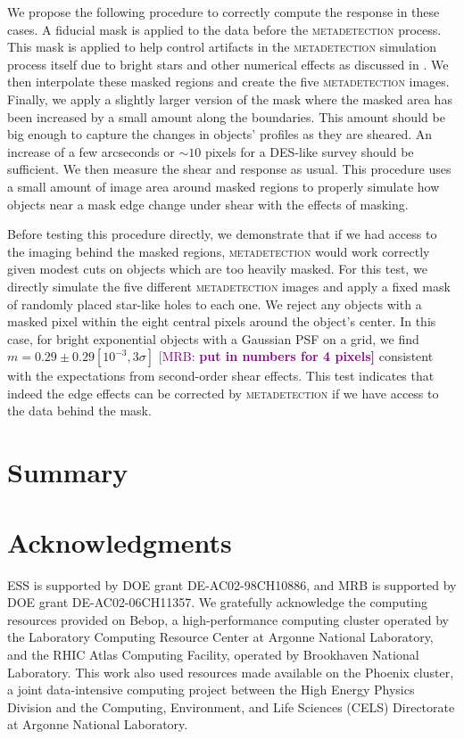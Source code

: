 \documentclass[twocolappendix, appendixfloats, numberedappendix, twocolumn, apj]{openjournal}
\newcommand{\mrb}[1]{\textcolor{purple}{[MRB: \bf #1]}\xspace}
\newcommand{\mdet}{\textsc{metadetection}\xspace}
\begin{document}
We propose the following procedure to correctly compute the response in these cases. A fiducial mask is applied to the data before 
the \mdet process. This mask is applied to help control artifacts in the \mdet simulation process itself due to bright stars 
and other numerical effects as discussed in \citep{sheldoninprep}. We then interpolate these masked regions and create the five 
\mdet images. Finally, we apply a slightly larger version of the mask where the masked area has been increased by a small amount 
along the boundaries. This amount should be big enough to capture the changes in objects' profiles as they are sheared. An 
increase of a few arcseconds or $\sim10$ pixels for a DES-like survey should be sufficient. We then measure the shear and 
response as usual. This procedure uses a small amount of image area around masked regions to properly simulate how objects near a 
mask edge change under shear with the effects of masking.

Before testing this procedure directly, we demonstrate that if we had access to the imaging behind the masked regions, \mdet would work 
correctly given modest cuts on objects which are too heavily masked. For this test, we directly simulate the five different \mdet images 
and apply a fixed mask of randomly placed star-like holes to each one. We reject any objects with a masked pixel within the eight central pixels around the object's center. In this case, for bright exponential objects with a Gaussian PSF on a grid, we find $m=0.29 \pm 0.29 [10^{-3}, 3\sigma]$ \mrb{put in numbers for 4 pixels} consistent with the expectations from second-order shear effects. This test indicates that indeed the edge effects can be corrected by \mdet if we have access to the data behind the mask.


\section{Summary}\label{sec:conc}

\section*{Acknowledgments}

ESS is supported by DOE grant DE-AC02-98CH10886, and MRB is supported by DOE
grant DE-AC02-06CH11357.  We gratefully acknowledge the computing resources
provided on Bebop, a high-performance computing cluster operated by the
Laboratory Computing Resource Center at Argonne National Laboratory, and the
RHIC Atlas Computing Facility, operated by Brookhaven National Laboratory.
This work also used resources made available on the Phoenix cluster, a joint
data-intensive computing project between the High Energy Physics Division and
the Computing, Environment, and Life Sciences (CELS) Directorate at Argonne
National Laboratory.




\end{document}
